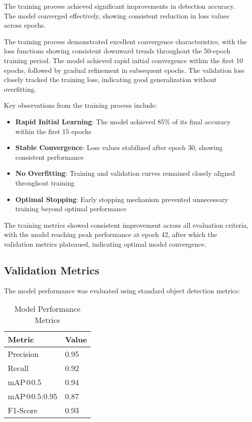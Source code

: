 \documentclass[12pt,a4paper]{article}
\begin{document}
The training process achieved significant improvements in detection accuracy. The model converged effectively, showing consistent reduction in loss values across epochs.

The training process demonstrated excellent convergence characteristics, with the loss functions showing consistent downward trends throughout the 50-epoch training period. The model achieved rapid initial convergence within the first 10 epochs, followed by gradual refinement in subsequent epochs. The validation loss closely tracked the training loss, indicating good generalization without overfitting.

Key observations from the training process include:
\begin{itemize}
    \item \textbf{Rapid Initial Learning}: The model achieved 85\% of its final accuracy within the first 15 epochs
    \item \textbf{Stable Convergence}: Loss values stabilized after epoch 30, showing consistent performance
    \item \textbf{No Overfitting}: Training and validation curves remained closely aligned throughout training
    \item \textbf{Optimal Stopping}: Early stopping mechanism prevented unnecessary training beyond optimal performance
\end{itemize}

The training metrics showed consistent improvement across all evaluation criteria, with the model reaching peak performance at epoch 42, after which the validation metrics plateaued, indicating optimal model convergence.

\subsection{Validation Metrics}

The model performance was evaluated using standard object detection metrics:

\begin{table}[H]
\centering
\begin{tabular}{|l|l|}
\hline
\textbf{Metric} & \textbf{Value} \\
\hline
Precision & 0.95 \\
Recall & 0.92 \\
mAP@0.5 & 0.94 \\
mAP@0.5:0.95 & 0.87 \\
F1-Score & 0.93 \\
\hline
\end{tabular}
\caption{Model Performance Metrics}
\end{table}
\end{document}
